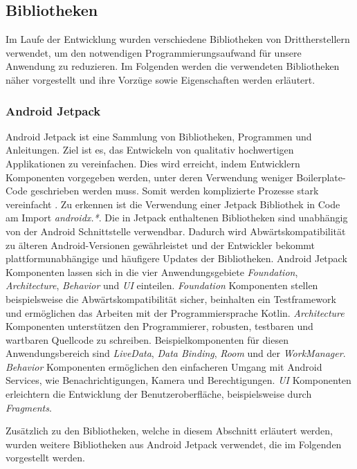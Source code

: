\documentclass[a4paper]{article}
\begin{document}
\subsection{Bibliotheken}
\label{subsec:technologies:bibs}
Im Laufe der Entwicklung wurden verschiedene Bibliotheken von Drittherstellern verwendet, um den notwendigen Programmierungsaufwand für unsere Anwendung zu reduzieren.
Im Folgenden werden die verwendeten Bibliotheken näher vorgestellt und ihre Vorzüge sowie Eigenschaften werden erläutert.


\subsubsection{Android Jetpack}
\label{subsubsec:technologies:bibs:jetpack}
Android Jetpack ist eine Sammlung von Bibliotheken, Programmen und Anleitungen. Ziel ist es, das Entwickeln von qualitativ hochwertigen Applikationen zu vereinfachen. Dies wird erreicht, indem Entwicklern Komponenten vorgegeben werden, unter deren Verwendung weniger Boilerplate-Code geschrieben werden muss. Somit werden komplizierte Prozesse stark vereinfacht \autocite{android_jetpack}. Zu erkennen ist die Verwendung einer Jetpack Bibliothek in Code am Import \textit{androidx.*}. Die in Jetpack enthaltenen Bibliotheken sind unabhängig von der Android Schnittstelle verwendbar. Dadurch wird Abwärtskompatibilität zu älteren Android-Versionen gewährleistet und der Entwickler bekommt plattformunabhängige und häufigere Updates der Bibliotheken. Android Jetpack Komponenten lassen sich in die vier Anwendungsgebiete \textit{Foundation}, \textit{Architecture}, \textit{Behavior} und \textit{UI} einteilen. \textit{Foundation} Komponenten stellen beispielsweise die Abwärtskompatibilität sicher, beinhalten ein Testframework und ermöglichen das Arbeiten mit der Programmiersprache Kotlin. \textit{Architecture} Komponenten unterstützen den Programmierer, robusten, testbaren und wartbaren Quellcode zu schreiben. Beispielkomponenten für diesen Anwendungsbereich sind \textit{LiveData}, \textit{Data Binding}, \textit{Room} und der \textit{WorkManager}. \textit{Behavior} Komponenten ermöglichen den einfacheren Umgang mit Android Services, wie Benachrichtigungen, Kamera und Berechtigungen. \textit{UI} Komponenten erleichtern die Entwicklung der Benutzeroberfläche, beispielsweise durch \textit{Fragments}.

Zusätzlich zu den Bibliotheken, welche in diesem Abschnitt erläutert werden, wurden weitere Bibliotheken aus Android Jetpack verwendet, die im Folgenden vorgestellt werden.
\end{document}

